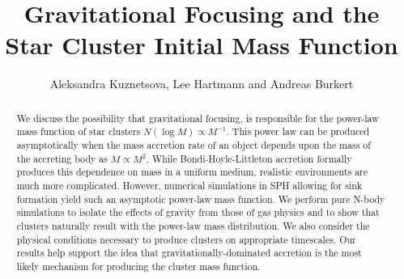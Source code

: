 \documentclass[iop]{emulateapj}
\begin{document}
\title{Gravitational Focusing and the Star Cluster Initial Mass Function}

\author{Aleksandra Kuznetsova, Lee Hartmann
and Andreas Burkert}



\newcommand\msun{\rm M_{\odot}}
\newcommand\mdot{\dot{M}}
\newcommand\lsun{\rm L_{\odot}}
\newcommand\msunyr{\rm M_{\odot}\,yr^{-1}}
\newcommand\be{\begin{equation}}
\newcommand\en{\end{equation}}
\newcommand\kms{\rm{\, km \, s^{-1}}}
\newcommand\K{\rm K}
\newcommand\etal{{\rm et al}.\ }
\newcommand\sd{\partial}
\newcommand\mpctwo{\msun \, {\rm pc^{-2}}}
\newcommand\rhoo{\rho_{\circ}}
\newcommand\cmthree{\rm cm^{-3}}
\newcommand\no{n_{\circ}}


\begin{abstract}
We discuss the possibility that gravitational focusing,
is responsible for the power-law mass function of star clusters
$N(\log M) \propto M^{-1}$.  This power law can be produced
asymptotically when the mass accretion rate of an object
depends upon the mass of the accreting body as $\mdot \propto M^2$.
While Bondi-Hoyle-Littleton accretion formally produces this dependence on
mass in a uniform medium, realistic environments are much more complicated.
However, numerical simulations in SPH allowing for sink formation yield
such an asymptotic power-law mass function.  We perform pure N-body simulations to isolate the effects of gravity from those of gas physics and 
to show that clusters naturally result with the power-law mass distribution.
We also consider the physical conditions necessary to produce clusters
on appropriate timescales.  Our results help support the idea that gravitationally-dominated
accretion is the most likely mechanism for producing the cluster mass function.
\end{abstract}

\end{document}

